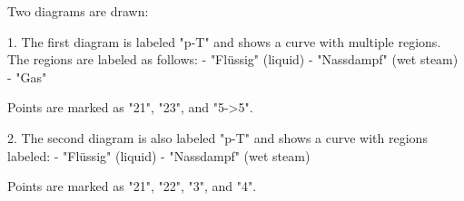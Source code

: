 Two diagrams are drawn:  

1. The first diagram is labeled "p-T" and shows a curve with multiple regions. The regions are labeled as follows:  
   - "Flüssig" (liquid)  
   - "Nassdampf" (wet steam)  
   - "Gas"  

   Points are marked as "21", "23", and "5->5".  

2. The second diagram is also labeled "p-T" and shows a curve with regions labeled:  
   - "Flüssig" (liquid)  
   - "Nassdampf" (wet steam)  

   Points are marked as "21", "22", "3", and "4".